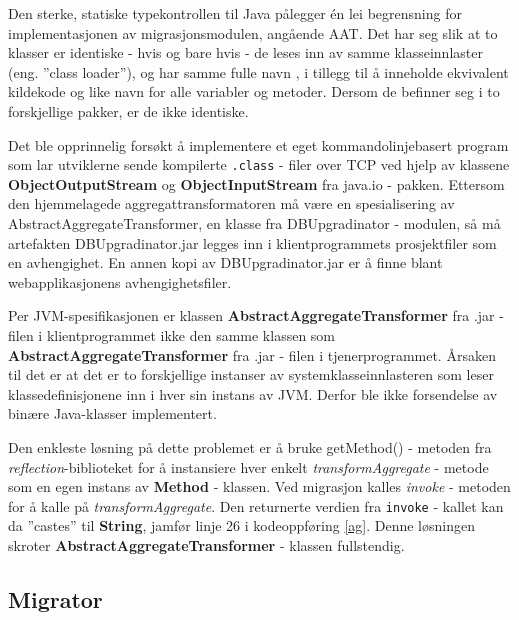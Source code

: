 Den sterke, statiske typekontrollen til Java pålegger én lei begrensning for implementasjonen av migrasjonsmodulen, angående AAT. Det har seg slik at to klasser er identiske - hvis og bare hvis - de leses inn av samme klasseinnlaster (eng. ''class loader''), og har samme fulle navn \citep{lindholm1999}, i tillegg til å inneholde ekvivalent kildekode og like navn for alle variabler og metoder. Dersom de befinner seg i to forskjellige pakker, er de ikke identiske.

Det ble opprinnelig forsøkt å implementere et eget kommandolinjebasert program som lar utviklerne sende kompilerte \texttt{.class} - filer over TCP ved hjelp av klassene \textbf{ObjectOutputStream} og \textbf{ObjectInputStream} fra java.io - pakken. Ettersom den hjemmelagede aggregattransformatoren må være en spesialisering av AbstractAggregateTransformer, en klasse fra DBUpgradinator - modulen, så må artefakten DBUpgradinator.jar legges inn i klientprogrammets prosjektfiler som en avhengighet. En annen kopi av DBUpgradinator.jar er å finne blant webapplikasjonens avhengighetsfiler.

Per JVM-spesifikasjonen er klassen \textbf{AbstractAggregateTransformer} fra .jar - filen i klientprogrammet ikke den samme klassen som \textbf{AbstractAggregateTransformer} fra .jar - filen i tjenerprogrammet. Årsaken til det er at det er to forskjellige instanser av systemklasseinnlasteren som leser klassedefinisjonene inn i hver sin instans av JVM. Derfor ble ikke forsendelse av binære Java-klasser implementert.

Den enkleste løsning på dette problemet er å bruke getMethod() - metoden fra \emph{reflection}-biblioteket for å instansiere hver enkelt \emph{transformAggregate} - metode som en egen instans av \textbf{Method} - klassen. Ved migrasjon kalles \emph{invoke} - metoden for å kalle på \emph{transformAggregate}. Den returnerte verdien fra \texttt{invoke} - kallet kan da ''castes'' til \textbf{String}, jamfør linje 26 i kodeoppføring \ref{ag}. Denne løsningen skroter \textbf{Abstract}\-\textbf{Aggregate}\-\textbf{Transformer} - klassen fullstendig.

\subsection{Migrator} \label{migrator}

